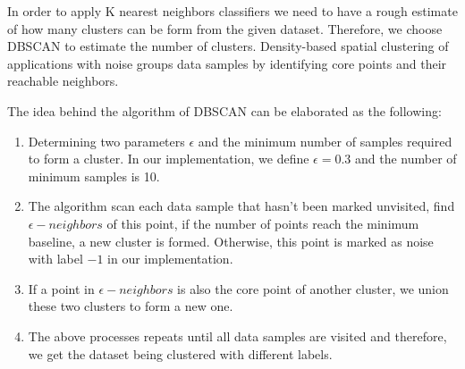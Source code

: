 \documentclass{article}
\begin{document}
In order to apply K nearest neighbors classifiers we need to have a rough estimate of how many clusters can be form from the given dataset. Therefore, we choose DBSCAN to estimate the number of clusters. Density-based spatial clustering of applications with noise groups data samples by identifying core points and their reachable neighbors.

The idea behind the algorithm of DBSCAN can be elaborated as the following:

\begin{enumerate}
    \item
    Determining two parameters $\epsilon$ and the minimum number of samples required to form a cluster. In our implementation, we define $\epsilon=0.3$ and the number of minimum samples is 10.

    \item
    The algorithm scan each data sample that hasn't been marked unvisited, find $\epsilon-neighbors$ of this point, if the number of points reach the minimum baseline, a new cluster is formed. Otherwise, this point is marked as noise with label $-1$ in our implementation.

    \item
    If a point in $\epsilon-neighbors$ is also the core point of another cluster, we union these two clusters to form a new one.

    \item
    The above processes repeats until all data samples are visited and therefore, we get the dataset being clustered with different labels.
\end{enumerate}
\end{document}
